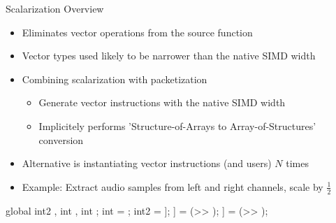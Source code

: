 
\begin{frame}[fragile]{Scalarization Overview}

\begin{itemize}
    \item Eliminates vector operations from the source function
    \item Vector types used likely to be narrower than the native SIMD width
    \item Combining scalarization with packetization
    \begin{itemize}
        \item Generate vector instructions with the native SIMD width
        \item Implicitely performs 'Structure-of-Arrays to Array-of-Structures' conversion
    \end{itemize}
    \item Alternative is instantiating vector instructions (and users) $N$ times
    \item Example: Extract audio samples  from left and right channels, scale by $\frac{1}{2}$
\end{itemize}

\begin{codebox}[commandchars=\\\[\]]
global int2 \uniform[*src], int \uniform[*left], int \uniform[*right];
int \varying[tid] = ;
int2 \varying[sample] = \uniform[src]\idx[\varying[tid]];
\uniform[left]\idx[\varying[tid]] = (\varying[sample.x] >> \uniform[1]);
\uniform[right]\idx[\varying[tid]] = (\varying[sample.y] >> \uniform[1]);
\end{codebox}

\end{frame}


